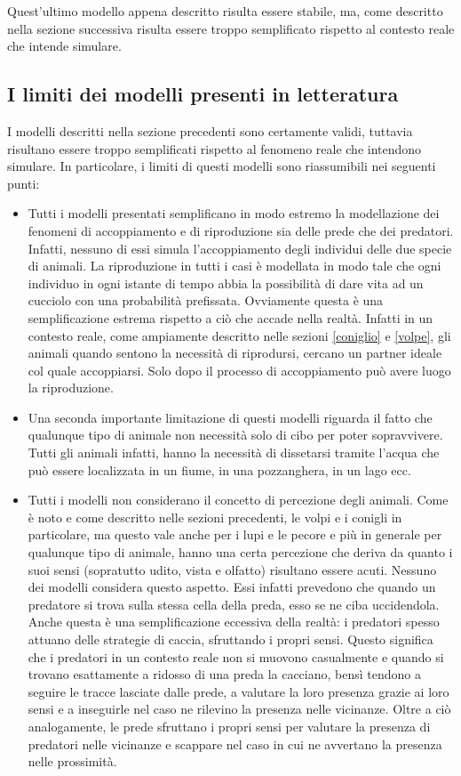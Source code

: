\documentclass[11pt]{article}
\begin{document}
Quest'ultimo modello appena descritto risulta essere stabile, ma, come descritto nella sezione successiva risulta essere troppo semplificato rispetto al contesto reale che intende simulare. 

\subsection{I limiti dei modelli presenti in letteratura}
I modelli descritti nella sezione precedenti sono certamente validi, tuttavia risultano essere troppo semplificati rispetto al fenomeno reale che intendono simulare. 
In particolare, i limiti di questi modelli sono riassumibili nei seguenti punti:
\begin{itemize}
    \item Tutti i modelli presentati semplificano in modo estremo la modellazione dei fenomeni di accoppiamento e di riproduzione sia delle prede che dei predatori. Infatti, nessuno di essi simula l'accoppiamento degli individui delle due specie di animali. La riproduzione in tutti i casi è modellata in modo tale che ogni individuo in ogni istante di tempo abbia la possibilità di dare vita ad un cucciolo con una probabilità prefissata. Ovviamente questa è una semplificazione estrema rispetto a ciò che accade nella realtà. Infatti in un contesto reale, come ampiamente descritto nelle sezioni \ref{coniglio} e \ref{volpe}, gli animali quando sentono la necessità di riprodursi, cercano un partner ideale col quale accoppiarsi. Solo dopo il processo di accoppiamento può avere luogo la riproduzione. 
    \item Una seconda importante limitazione di questi modelli riguarda il fatto che qualunque tipo di animale non necessità solo di cibo per poter sopravvivere. Tutti gli animali infatti, hanno la necessità di dissetarsi tramite l'acqua che può essere localizzata in un fiume, in una pozzanghera, in un lago ecc. 
    \item Tutti i modelli non considerano il concetto di percezione degli animali. Come è noto e come descritto nelle sezioni precedenti, le volpi e i conigli in particolare, ma questo vale anche per i lupi e le pecore e più in generale per qualunque tipo di animale, hanno una certa percezione che deriva da quanto i suoi sensi (sopratutto udito, vista e olfatto) risultano essere acuti. Nessuno dei modelli considera questo aspetto. Essi infatti prevedono che quando un predatore si trova sulla stessa cella della preda, esso se ne ciba uccidendola. Anche questa è una semplificazione eccessiva della realtà: i predatori spesso attuano delle strategie di caccia, sfruttando i propri sensi. Questo significa che i predatori in un contesto reale non si muovono casualmente e quando si trovano esattamente a ridosso di una preda la cacciano, bensì tendono a seguire le tracce lasciate dalle prede, a valutare la loro presenza grazie ai loro sensi e a inseguirle nel caso ne rilevino la presenza nelle vicinanze. Oltre a ciò analogamente, le prede sfruttano i propri sensi per valutare la presenza di predatori nelle vicinanze e scappare nel caso in cui ne avvertano la presenza nelle prossimità.

\end{itemize}
\end{document}
